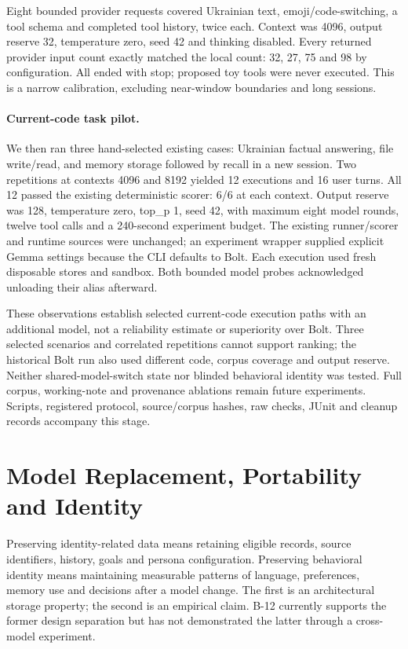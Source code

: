 \documentclass[11pt,a4paper]{article}
\begin{document}
Eight bounded provider requests covered Ukrainian text, emoji/code-switching, a tool schema and completed tool history, twice each. Context was 4096, output reserve 32, temperature zero, seed 42 and thinking disabled. Every returned provider input count exactly matched the local count: 32, 27, 75 and 98 by configuration. All ended with stop; proposed toy tools were never executed. This is a narrow calibration, excluding near-window boundaries and long sessions.

\paragraph{Current-code task pilot.}
We then ran three hand-selected existing cases: Ukrainian factual answering, file write/read, and memory storage followed by recall in a new session. Two repetitions at contexts 4096 and 8192 yielded 12 executions and 16 user turns. All 12 passed the existing deterministic scorer: 6/6 at each context. Output reserve was 128, temperature zero, top\_p 1, seed 42, with maximum eight model rounds, twelve tool calls and a 240-second experiment budget. The existing runner/scorer and runtime sources were unchanged; an experiment wrapper supplied explicit Gemma settings because the CLI defaults to Bolt. Each execution used fresh disposable stores and sandbox. Both bounded model probes acknowledged unloading their alias afterward.

These observations establish selected current-code execution paths with an additional model, not a reliability estimate or superiority over Bolt. Three selected scenarios and correlated repetitions cannot support ranking; the historical Bolt run also used different code, corpus coverage and output reserve. Neither shared-model-switch state nor blinded behavioral identity was tested. Full corpus, working-note and provenance ablations remain future experiments. Scripts, registered protocol, source/corpus hashes, raw checks, JUnit and cleanup records accompany this stage.

\section{Model Replacement, Portability and Identity}\label{sec:portability}
Preserving identity-related data means retaining eligible records, source identifiers, history, goals and persona configuration. Preserving behavioral identity means maintaining measurable patterns of language, preferences, memory use and decisions after a model change. The first is an architectural storage property; the second is an empirical claim. B-12 currently supports the former design separation but has not demonstrated the latter through a cross-model experiment.
\end{document}
